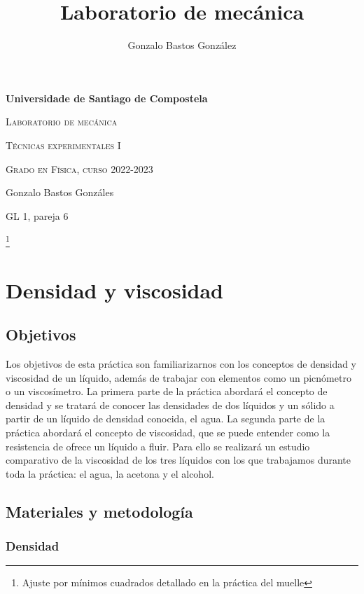 \documentclass[a4paper,12pt,titlepage]{report}
\title{Laboratorio de mecánica}
\author{Gonzalo Bastos González}
\begin{document}
\begin{titlepage}
    \centering
    {\bfseries\LARGE Universidade de Santiago de Compostela \par}
    \vspace{3cm}
    {\scshape\Huge Laboratorio de mecánica \par}
    \vspace{3cm}
    {\scshape\Large Técnicas experimentales I \par}
    \vspace{1cm}
    {\scshape\Large Grado en Física, curso 2022-2023 \par}
    \vfill
    {\Large Gonzalo Bastos Gonzáles \par}
    {\Large GL 1, pareja 6 \par}
    \vspace{3cm}
    \end{titlepage}

\tableofcontents
\footnote{Ajuste por mínimos cuadrados detallado en la práctica del muelle}

\chapter{Densidad y viscosidad}

\section{Objetivos}

Los objetivos de esta práctica son familiarizarnos con los conceptos de densidad y viscosidad de un líquido, además de trabajar con elementos como un picnómetro o un viscosímetro. La primera parte de la práctica abordará el concepto de densidad y se tratará de conocer las densidades de dos líquidos y un sólido a partir de un líquido de densidad conocida, el agua.
La segunda parte de la práctica abordará el concepto de viscosidad, que se puede entender como la resistencia de ofrece un líquido a fluir. Para ello se realizará un estudio comparativo de la viscosidad de los tres líquidos con los que trabajamos durante toda la práctica: el agua, la acetona y el alcohol.

\section{Materiales y metodología}

\subsection{Densidad}
\end{document}
